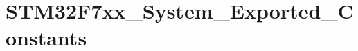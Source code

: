\hypertarget{group___s_t_m32_f7xx___system___exported___constants}{}\section{S\+T\+M32\+F7xx\+\_\+\+System\+\_\+\+Exported\+\_\+\+Constants}
\label{group___s_t_m32_f7xx___system___exported___constants}
